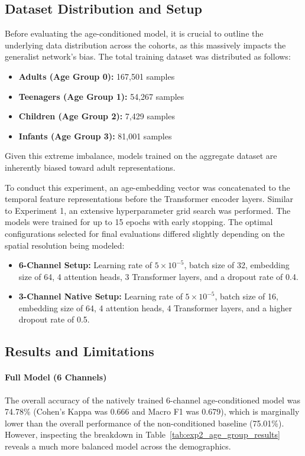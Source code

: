 \subsection{Dataset Distribution and Setup}
Before evaluating the age-conditioned model, it is crucial to outline the underlying data distribution across the cohorts, as this massively impacts the generalist network's bias. The total training dataset was distributed as follows:
\begin{itemize}
    \item \textbf{Adults (Age Group 0):} 167,501 samples
    \item \textbf{Teenagers (Age Group 1):} 54,267 samples
    \item \textbf{Children (Age Group 2):} 7,429 samples
    \item \textbf{Infants (Age Group 3):} 81,001 samples
\end{itemize}
Given this extreme imbalance, models trained on the aggregate dataset are inherently biased toward adult representations. 

To conduct this experiment, an age-embedding vector was concatenated to the temporal feature representations before the Transformer encoder layers. Similar to Experiment 1, an extensive hyperparameter grid search was performed. The models were trained for up to 15 epochs with early stopping. The optimal configurations selected for final evaluations differed slightly depending on the spatial resolution being modeled:
\begin{itemize}
    \item \textbf{6-Channel Setup:} Learning rate of $5 \times 10^{-5}$, batch size of 32, embedding size of 64, 4 attention heads, 3 Transformer layers, and a dropout rate of 0.4.
    \item \textbf{3-Channel Native Setup:} Learning rate of $5 \times 10^{-5}$, batch size of 16, embedding size of 64, 4 attention heads, 4 Transformer layers, and a higher dropout rate of 0.5.
\end{itemize}

\subsection{Results and Limitations}

\paragraph{Full Model (6 Channels)}
The overall accuracy of the natively trained 6-channel age-conditioned model was 74.78\% (Cohen's Kappa was 0.666 and Macro F1 was 0.679), which is marginally lower than the overall performance of the non-conditioned baseline (75.01\%). However, inspecting the breakdown in Table~\ref{tab:exp2_age_group_results} reveals a much more balanced model across the demographics. 

